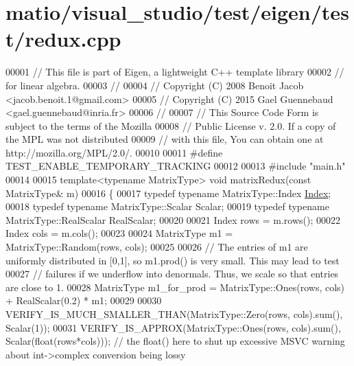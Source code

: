 \hypertarget{matio_2visual__studio_2test_2eigen_2test_2redux_8cpp_source}{}\section{matio/visual\+\_\+studio/test/eigen/test/redux.cpp}
\label{matio_2visual__studio_2test_2eigen_2test_2redux_8cpp_source}

\begin{DoxyCode}
00001 \textcolor{comment}{// This file is part of Eigen, a lightweight C++ template library}
00002 \textcolor{comment}{// for linear algebra.}
00003 \textcolor{comment}{//}
00004 \textcolor{comment}{// Copyright (C) 2008 Benoit Jacob <jacob.benoit.1@gmail.com>}
00005 \textcolor{comment}{// Copyright (C) 2015 Gael Guennebaud <gael.guennebaud@inria.fr>}
00006 \textcolor{comment}{//}
00007 \textcolor{comment}{// This Source Code Form is subject to the terms of the Mozilla}
00008 \textcolor{comment}{// Public License v. 2.0. If a copy of the MPL was not distributed}
00009 \textcolor{comment}{// with this file, You can obtain one at http://mozilla.org/MPL/2.0/.}
00010 
00011 \textcolor{preprocessor}{#define TEST\_ENABLE\_TEMPORARY\_TRACKING}
00012 
00013 \textcolor{preprocessor}{#include "main.h"}
00014 
00015 \textcolor{keyword}{template}<\textcolor{keyword}{typename} MatrixType> \textcolor{keywordtype}{void} matrixRedux(\textcolor{keyword}{const} MatrixType& m)
00016 \{
00017   \textcolor{keyword}{typedef} \textcolor{keyword}{typename} MatrixType::Index \hyperlink{namespace_eigen_a62e77e0933482dafde8fe197d9a2cfde}{Index};
00018   \textcolor{keyword}{typedef} \textcolor{keyword}{typename} MatrixType::Scalar Scalar;
00019   \textcolor{keyword}{typedef} \textcolor{keyword}{typename} MatrixType::RealScalar RealScalar;
00020 
00021   Index rows = m.rows();
00022   Index cols = m.cols();
00023 
00024   MatrixType m1 = MatrixType::Random(rows, cols);
00025 
00026   \textcolor{comment}{// The entries of m1 are uniformly distributed in [0,1], so m1.prod() is very small. This may lead to
       test}
00027   \textcolor{comment}{// failures if we underflow into denormals. Thus, we scale so that entries are close to 1.}
00028   MatrixType m1\_for\_prod = MatrixType::Ones(rows, cols) + RealScalar(0.2) * m1;
00029 
00030   VERIFY\_IS\_MUCH\_SMALLER\_THAN(MatrixType::Zero(rows, cols).sum(), Scalar(1));
00031   VERIFY\_IS\_APPROX(MatrixType::Ones(rows, cols).sum(), Scalar(\textcolor{keywordtype}{float}(rows*cols))); \textcolor{comment}{// the float() here to
       shut up excessive MSVC warning about int->complex conversion being lossy}

\end{DoxyCode}

